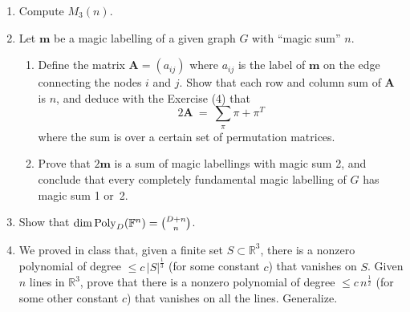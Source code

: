 \documentclass[11pt]{article}
\def\A{\mathbf{A}}
\def\R{\mathbb{R}}
\def\F{\mathbb{F}}
\def\m{\mathbf{m}}
\begin{document}
\begin{enumerate}[(1)]
\item Compute $M_3(n)$.

\item Let $\m$ be a magic labelling of a given graph $G$ with ``magic sum'' $n$.
\begin{enumerate}
  \item Define the matrix $\A = (a_{ ij })$ where $a_{ ij }$ is the label of $\m$ on the edge connecting the nodes $i$ and $j$. Show that
each row and column sum of $\A$ is $n$, and deduce with the Exercise (4) that
  \[
    2 \A \ = \ \sum_\pi \pi + \pi^T
  \]
  where the sum is over a certain set of permutation matrices.
  \item Prove that $2 \m$ is a sum of magic labellings with magic sum 2, and conclude that every completely fundamental magic labelling of
$G$ has magic sum 1 or~2.
\end{enumerate}

\item Show that $\dim {\rm Poly}_D(\F^n) = \binom{ D+n } n$.

\item We proved in class that, given a finite set $S \subset \R^3$, there is a nonzero polynomial of degree $\le c \, |S|^{ \frac 1 3 }$ (for
some constant $c$) that vanishes on $S$. Given $n$ lines in $\R^3$, prove that there is a nonzero polynomial of degree $\le c \, n^{ \frac 1 2 }$ (for some other constant $c$) that vanishes on all the lines. Generalize.

\end{enumerate}
\end{document}

